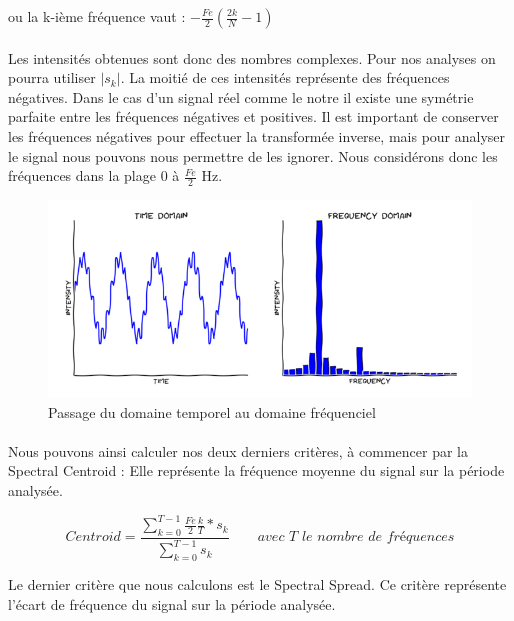 \documentclass{ir}
\begin{document}
ou la k-ième fréquence vaut : $-\frac{Fe}{2} (\frac{2k}{N} - 1)$

\paragraph{}
Les intensités obtenues sont donc des nombres complexes. Pour nos analyses on pourra utiliser $|s_k|$. La 
moitié de ces intensités représente des fréquences négatives. Dans le cas d'un signal réel comme le notre 
il existe une symétrie parfaite entre les fréquences négatives et positives. Il est important de conserver 
les fréquences négatives pour effectuer la transformée inverse, mais pour analyser le signal nous pouvons 
nous permettre de les ignorer. Nous considérons donc les fréquences dans la plage 0 à $\frac{Fe}{2}$ Hz.

\begin{figure}[ht]
    \centering
    \includegraphics[scale=0.7]{images/Fourier.png}
    \caption{Passage du domaine temporel au domaine fréquenciel}
    \label{ex_Fourier}
\end{figure}

\paragraph{}
Nous pouvons ainsi calculer nos deux derniers critères, à commencer par la Spectral Centroid : Elle représente la 
fréquence moyenne du signal sur la période analysée.

\begin{equation}
    Centroid = \frac{ \sum_{k = 0}^{T-1} \frac{Fe}{2} \frac{k}{T} * s_k}{\sum_{k=0}^{T-1} s_k}
    \qquad \textit{avec T le nombre de fréquences}
\end{equation}

Le dernier critère que nous calculons est le Spectral Spread. Ce critère représente l'écart de fréquence du
signal sur la période analysée.
\end{document}
